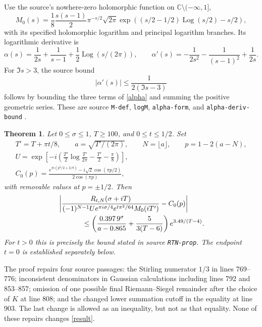 \documentclass[11pt]{article}
\newcommand{\C}{\mathbb C}
\newtheorem{theorem}{Theorem}
\begin{document}
Use the source's nowhere-zero holomorphic function on
$\C\setminus(-\infty,1]$,
\begin{equation}\label{defM}
 M_0(s)=\frac18\frac{s(s-1)}2\pi^{-s/2}\sqrt{2\pi}
 \exp\!\left((s/2-1/2)\operatorname{Log}(s/2)-s/2\right),
\end{equation}
with its specified holomorphic logarithm and principal logarithm
branches. Its logarithmic derivative is
\begin{equation}\label{alpha}
 \alpha(s)=\frac1{2s}+\frac1{s-1}+\frac12\operatorname{Log}(s/(2\pi)),
 \qquad
 \alpha'(s)=-\frac1{2s^2}-\frac1{(s-1)^2}+\frac1{2s}.
\end{equation}
For $\Im s>3$, the source bound
\begin{equation}\label{alphabound}
 |\alpha'(s)|\le\frac1{2(\Im s-3)}
\end{equation}
follows by bounding the three terms of \eqref{alpha} and summing
the positive geometric series. These are source \texttt{M-def},
\texttt{logM}, \texttt{alpha-form}, and
\texttt{alpha-deriv-bound} \cite{polymath}.

\begin{theorem}\label{main}
Let $0\le\sigma\le1$, $T\ge100$, and $0\le t\le1/2$. Set
\begin{gather*}
 T'=T+\pi t/8,\qquad a=\sqrt{T'/(2\pi)},\qquad N=\lfloor a\rfloor,
 \qquad p=1-2(a-N),\\
 U=\exp\!\left[-i\left(\frac{T'}2\log\frac{T'}{2\pi}
                   -\frac{T'}2-\frac\pi8\right)\right],\\
 C_0(p)=\frac{e^{\pi i(p^2/2+3/8)}-i\sqrt2\cos(\pi p/2)}{2\cos(\pi p)},
\end{gather*}
with removable values at $p=\pm1/2$. Then
\begin{align}\label{result}
 &\left|\frac{R_{t,N}(\sigma+iT)}
 {(-1)^{N-1}Ue^{\pi i\sigma/4}e^{t\pi^2/64}M_0(iT')}-C_0(p)\right|\\
 &\hspace{12mm}\le
 \left(\frac{0.397\,9^\sigma}{a-0.865}+\frac5{3(T-6)}\right)
                      e^{3.49/(T-4)}.\nonumber
\end{align}
For $t>0$ this is precisely the bound stated in source
\texttt{RTN-prop}. The endpoint $t=0$ is established separately below.
\end{theorem}

The proof repairs four source passages: the Stirling numerator $1/3$
in lines 769--776; inconsistent denominators in Gaussian calculations
including lines 792 and 853--857; omission of one possible final
Riemann--Siegel remainder after the choice of $K$ at line 808; and the
changed lower summation cutoff in the equality at line 903. The
last change is allowed as an inequality, but not as that equality.
None of these repairs changes \eqref{result}.
\end{document}
